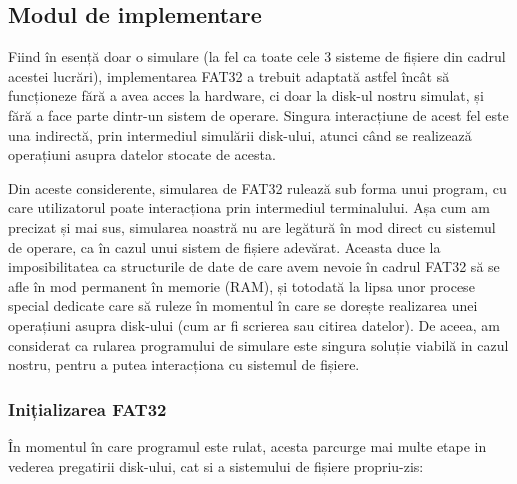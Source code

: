 \subsection{Modul de implementare}

Fiind în esență doar o simulare (la fel ca toate cele 3 sisteme de fișiere din cadrul acestei lucrări), implementarea FAT32 a trebuit adaptată astfel încât să funcționeze fără a avea acces la hardware, ci doar la disk-ul nostru simulat, și fără a face parte dintr-un sistem de operare. Singura interacțiune de acest fel este una indirectă, prin intermediul simulării disk-ului, atunci când se realizează operațiuni asupra datelor stocate de acesta.

Din aceste considerente, simularea de FAT32 rulează sub forma unui program, cu care utilizatorul poate interacționa prin intermediul terminalului. Așa cum am precizat și mai sus, simularea noastră nu are legătură în mod direct cu sistemul de operare, ca în cazul unui sistem de fișiere adevărat. Aceasta duce la imposibilitatea ca structurile de date de care avem nevoie în cadrul FAT32 să se afle în mod permanent în memorie (RAM), și totodată la lipsa unor procese special dedicate care să ruleze în momentul în care se dorește realizarea unei operațiuni asupra disk-ului (cum ar fi scrierea sau citirea datelor). De aceea, am considerat ca rularea programului de simulare este singura soluție viabilă in cazul nostru, pentru a putea interacționa cu sistemul de fișiere.


\subsubsection{Inițializarea FAT32}

În momentul în care programul este rulat, acesta parcurge mai multe etape in vederea pregatirii disk-ului, cat si a sistemului de fișiere propriu-zis:

